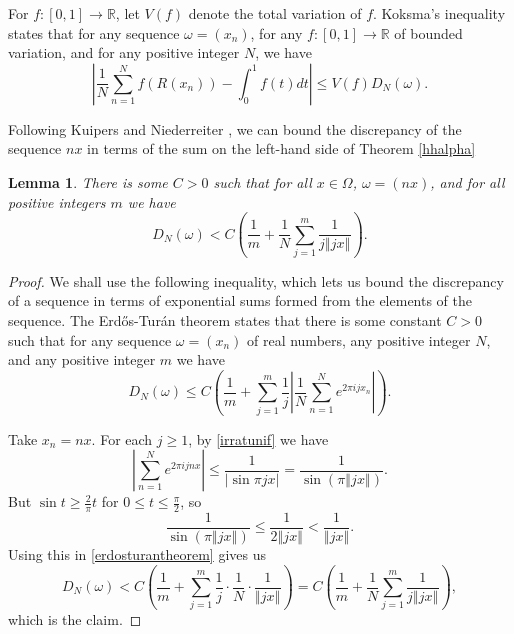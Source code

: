 \documentclass{amsart}
\newcommand{\norm}[1]{\left\Vert #1 \right\Vert}
\newtheorem{lemma}[theorem]{Lemma}
\begin{document}
For $f:[0,1] \to \mathbb{R}$, let $V(f)$ denote the total variation of $f$.
Koksma's inequality \cite[p.~143, Theorem 5.1]{kuipers} states that for any sequence $\omega=(x_n)$,  
for any $f:[0,1] \to \mathbb{R}$ of bounded variation, and for any positive integer $N$, we have
\begin{equation}
\left| \frac{1}{N} \sum_{n=1}^N f(R(x_n))-\int_0^1 f(t) dt \right| \leq V(f) D_N(\omega).
\label{koksma}
\end{equation}


Following Kuipers and Niederreiter \cite[p.~122, Lemma 3.2]{kuipers}, we can bound the discrepancy of the sequence $nx$ in terms of the sum on the left-hand side
of  Theorem \ref{hhalpha}

\begin{lemma}
There is some $C>0$ such that for all  $x \in \Omega$,  $\omega=(nx)$, and for all positive integers $m$
we have
\[
D_N(\omega) < C\left(\frac{1}{m}+\frac{1}{N}\sum_{j=1}^m \frac{1}{j \norm{jx}}\right).
\]
\label{erdosturan}
\end{lemma}
\begin{proof}
We shall use the following inequality, which lets us bound the discrepancy of a sequence in terms of exponential sums formed from the elements of the sequence.
The Erd\H os-Tur\'an theorem \cite[p.~114, Eq. 2.42]{kuipers} states that there is some constant $C>0$ such that for any sequence
 $\omega=(x_n)$ of real numbers, any positive integer $N$, and any positive integer $m$ we have
\begin{equation}
 D_N(\omega) \leq C\left(\frac{1}{m}+\sum_{j=1}^m \frac{1}{j} \left| \frac{1}{N} \sum_{n=1}^N e^{2\pi i j x_n} \right| \right).
 \label{erdosturantheorem}
\end{equation}

Take $x_n=nx$. For each $j \geq 1$, by \eqref{irratunif} we have
\[
\left| \sum_{n=1}^N e^{2\pi i jnx} \right| 
\leq \frac{1}{| \sin \pi j x|}
=\frac{1}{\sin(\pi \norm{jx})}.
\]
But $\sin t \geq \frac{2}{\pi}t$ for $0 \leq t \leq \frac{\pi}{2}$, so 
\[
\frac{1}{\sin(\pi \norm{jx})} \leq \frac{1}{2\norm{jx}}<\frac{1}{\norm{jx}}.
\]
Using this in \eqref{erdosturantheorem} gives us
\[
D_N(\omega) < C\left(\frac{1}{m}+\sum_{j=1}^m \frac{1}{j} \cdot \frac{1}{N} \cdot \frac{1}{\norm{jx}}\right)
= C\left(\frac{1}{m}+\frac{1}{N} \sum_{j=1}^m \frac{1}{j\norm{jx}}\right),
\]
which is the claim.
\end{proof}
\end{document}
